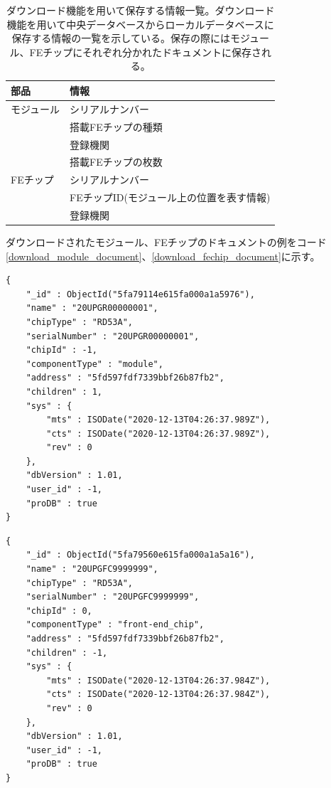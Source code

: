 \begin{table}[tbp]
\begin{center}
\caption[ダウンロード機能を用いて保存する情報一覧。]{ダウンロード機能を用いて保存する情報一覧。ダウンロード機能を用いて中央データベースからローカルデータベースに保存する情報の一覧を示している。保存の際にはモジュール、FEチップにそれぞれ分かれたドキュメントに保存される。}
\label{download_information}
  \small
  \begin{tabular}{|ll|} \hline
    部品 & 情報 \\ \hline
    モジュール & シリアルナンバー \\ 
     & 搭載FEチップの種類  \\ 
     & 登録機関  \\ 
     & 搭載FEチップの枚数  \\ \hline 
    FEチップ & シリアルナンバー \\
     & FEチップID(モジュール上の位置を表す情報) \\  
     & 登録機関 \\ \hline 
  \end{tabular}
\end{center}
\end{table}

ダウンロードされたモジュール、FEチップのドキュメントの例をコード\ref{download_module_document}、\ref{download_fechip_document}に示す。
\begin{lstlisting}[basicstyle=\scriptsize,caption=ダウンロードしたモジュール情報のドキュメントの例。ドキュメントが表\ref{download_information}の情報を持つことが分かる。,label=download_module_document]
{
	"_id" : ObjectId("5fa79114e615fa000a1a5976"),
	"name" : "20UPGR00000001",
	"chipType" : "RD53A",
	"serialNumber" : "20UPGR00000001",
	"chipId" : -1,
	"componentType" : "module",
	"address" : "5fd597fdf7339bbf26b87fb2",
	"children" : 1,
	"sys" : {
		"mts" : ISODate("2020-12-13T04:26:37.989Z"),
		"cts" : ISODate("2020-12-13T04:26:37.989Z"),
		"rev" : 0
	},
	"dbVersion" : 1.01,
	"user_id" : -1,
	"proDB" : true
}
\end{lstlisting}
\begin{lstlisting}[basicstyle=\scriptsize,caption=ダウンロードしたFEチップ情報のドキュメントの例。ドキュメントが表\ref{download_information}の情報を持つことが分かる。,label=download_fechip_document]
{
	"_id" : ObjectId("5fa79560e615fa000a1a5a16"),
	"name" : "20UPGFC9999999",
	"chipType" : "RD53A",
	"serialNumber" : "20UPGFC9999999",
	"chipId" : 0,
	"componentType" : "front-end_chip",
	"address" : "5fd597fdf7339bbf26b87fb2",
	"children" : -1,
	"sys" : {
		"mts" : ISODate("2020-12-13T04:26:37.984Z"),
		"cts" : ISODate("2020-12-13T04:26:37.984Z"),
		"rev" : 0
	},
	"dbVersion" : 1.01,
	"user_id" : -1,
	"proDB" : true
}
\end{lstlisting}

